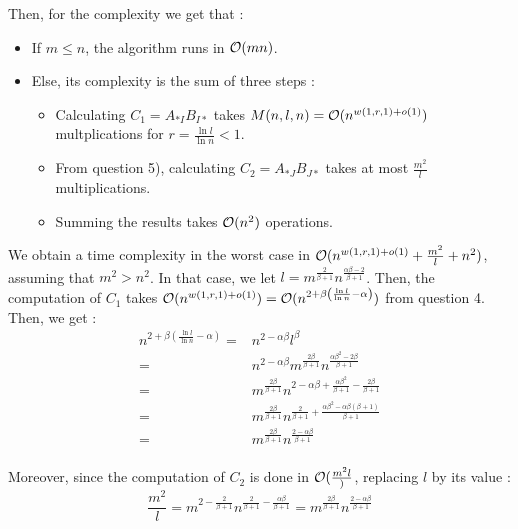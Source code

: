 \documentclass{Cours}
\begin{document}
        Then, for the complexity we get that :
        \begin{itemize}
            \item If $m \leq n$, the algorithm runs in $\mathcal{O}(mn)$.
            \item Else, its complexity is the sum of three steps :
            \begin{itemize}
                \item Calculating $C_{1} = A_{*I}B_{I*}$ takes $M(n, l, n) = \mathcal{O}(n^{w(1, r, 1) + o(1)})$ multplications for $r = \frac{\ln l}{\ln n} < 1$.
                \item From question 5), calculating $C_{2} = A_{*J}B_{J*}$ takes at most $\frac{m^{2}}{l}$ multiplications. 
                \item Summing the results takes $\mathcal{O}(n^{2})$ operations.
            \end{itemize}
        \end{itemize}

        We obtain a time complexity in the worst case in $\mathcal{O}(n^{w(1, r, 1) + o(1)} + \frac{m^{2}}{l} + n^{2})$, assuming that $m^{2} > n^{2}$.
        In that case, we let $l = m^{\frac{2}{\beta + 1}}n^{\frac{\alpha\beta - 2}{\beta + 1}}$.
        Then, the computation of $C_{1}$ takes $\mathcal{O}(n^{w(1, r, 1) + o(1)}) = \mathcal{O}(n^{2 + \beta\left(\frac{\ln l}{\ln n} - \alpha\right)})$ from question 4. Then, we get : 
        \[
            \begin{aligned}
                n^{2 + \beta\left(\frac{\ln l}{\ln n} - \alpha\right)} =& n^{2 - \alpha\beta} l^{\beta} \\
                =& n^{2 - \alpha\beta}m^{\frac{2\beta}{\beta + 1}}n^{\frac{\alpha\beta^{2} - 2\beta}{\beta + 1}}\\
                =& m^{\frac{2\beta}{\beta + 1}}n^{2 - \alpha\beta + \frac{\alpha\beta^{2}}{\beta + 1} - \frac{2 \beta}{\beta + 1}}\\
                =& m^{\frac{2\beta}{\beta + 1}}n^{\frac{2}{\beta+1} + \frac{\alpha\beta^{2} - \alpha\beta\left(\beta + 1\right)}{\beta + 1}}\\
                =& m^{\frac{2\beta}{\beta + 1}}n^{\frac{2 - \alpha \beta}{\beta + 1}}\\
            \end{aligned}
        \]

        Moreover, since the computation of $C_{2}$ is done in $\mathcal{O}(\frac{m^{2}{l}})$, replacing $l$ by its value : 
        \[
            \frac{m^{2}}{l} = m^{2 - \frac{2}{\beta + 1}}n^{\frac{2}{\beta + 1} - \frac{\alpha \beta}{\beta + 1}} = m^{\frac{2\beta}{\beta + 1}}n^{\frac{2 - \alpha\beta}{\beta + 1}}
        \]
            
\end{document}
